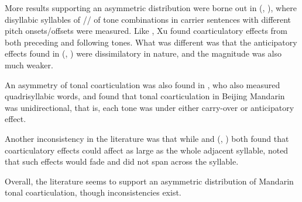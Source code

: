 \documentclass[12pt]{report}
\newcommand{\tip}{\textipa}
\begin{document}
\begin{CJK}{UTF8}{bsmi}
More results supporting an asymmetric distribution were borne out in \citeauthor{Xu1994a} (\citeyear{Xu1994a}, \citeyear{Xu1997}), where disyllabic syllables of /\tip{ma.ma}/ of tone combinations in carrier sentences with different pitch onsets/offsets were measured. Like \cite{Shen1990}, Xu found coarticulatory effects from both preceding and following tones. What was different was that the anticipatory effects found in \citeauthor{Xu1994a} (\citeyear{Xu1994a}, \citeyear{Xu1997}) were dissimilatory in nature, and the magnitude was also much weaker.

An asymmetry of tonal coarticulation was also found in \cite{LinYan1991}, who also measured quadrisyllabic words, and found that tonal coarticulation in Beijing Mandarin was unidirectional, that is, each tone was under either carry-over or anticipatory effect.

Another inconsistency in the literature was that while \cite{Shen1990} and \citeauthor{Xu1994a} (\citeyear{Xu1994a}, \citeyear{Xu1997}) both found that coarticulatory effects could affect as large as the whole adjacent syllable, \cite{LinYan1991} noted that such effects would fade and did not span across the syllable.

Overall, the literature seems to support an asymmetric distribution of Mandarin tonal coarticulation, though inconsistencies exist.


\end{CJK}
\end{document}
